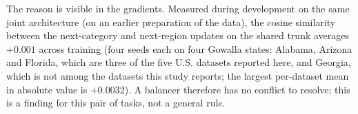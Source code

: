 The reason is visible in the gradients. Measured during development on the same
joint architecture (on an earlier preparation of the data), the cosine
similarity between the next-category and next-region updates on the shared
trunk averages $+0.001$ across training (four seeds each on four Gowalla
states: Alabama, Arizona and Florida, which are three of the five U.S. datasets reported
here, and Georgia, which is not among the datasets this study reports; the largest per-dataset mean in
absolute value is $+0.0032$). A balancer therefore has no
conflict to resolve; this is a finding for this pair of tasks, not a
general rule.
